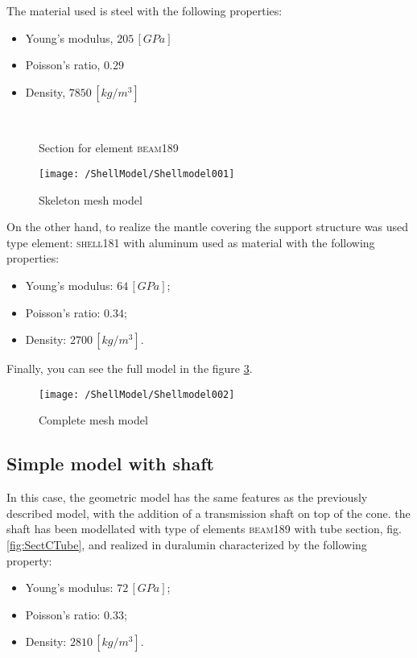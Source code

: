 The material used is steel with the following properties:
\begin{itemize}
\item Young's modulus, $205\,[GPa]$ 
\item Poisson's ratio, $0.29$
\item Density, $7850	\,[kg/m^3]$
\end{itemize}

\begin{figure}[!htb]
\centering
{} \quad
{}\\
\caption{Section for element \textsc{beam189}}
\label{fig:SectionGeometry}
\end{figure}

\begin{figure}[!htb]
\centering
\texttt{[image: /ShellModel/Shellmodel001]}
\caption{Skeleton mesh model}
\label{fig:Ansys1Mesh}
\end{figure}

\noindent On the other hand, to realize the mantle covering the support structure was used type element: \textsc{shell181} with aluminum used as material with the following properties:
\begin{itemize}
\item Young's modulus: $64\,[GPa]$;
\item Poisson's ratio: $0.34$;
\item Density: $2700\,[kg/m^3]$.
\end{itemize}
Finally, you can see the full model in the figure \ref{fig:Ansys2Mesh}.

\begin{figure}[!htb]
\centering
\texttt{[image: /ShellModel/Shellmodel002]}
\caption{Complete mesh model}
\label{fig:Ansys2Mesh}
\end{figure}

\subsection{Simple model with shaft}
In this case, the geometric model has the same features as the previously described model, with the addition of a transmission shaft on top of the cone.
the shaft has been modellated with type of elements \textsc{beam189} with tube section, fig. \ref{fig:SectCTube}, and realized in duralumin characterized by the following property:
\newpage
\begin{itemize}
\item Young's modulus: $72\,[GPa]$;
\item Poisson's ratio: $0.33$;
\item Density: $2810\,[kg/m^3]$.
\end{itemize}

